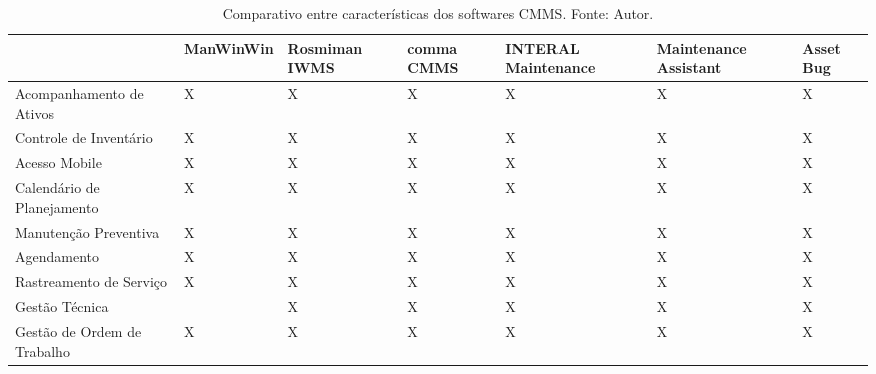 \begin{landscape}
\begin{table}[H]
\centering
\caption{Comparativo entre características dos softwares CMMS. Fonte: Autor.}
\label{comparativo}
\begin{tabular}{ | p{6cm} | p{3cm} | p{2cm} | p{2cm} | p{3cm} | p{3cm} | p{2cm} | }
\hline
	      & ManWinWin & Rosmiman IWMS & comma CMMS & INTERAL Maintenance & Maintenance Assistant & Asset Bug \\ \hline
	Acompanhamento de Ativos & X & X & X & X & X & X \\ \hline
	Controle de Inventário & X & X & X & X & X & X \\ \hline
	Acesso Mobile & X & X & X & X & X & X \\ \hline
	Calendário de Planejamento & X & X & X & X & X & X \\ \hline
	Manutenção Preventiva & X & X & X & X & X & X \\ \hline
	Agendamento & X & X & X & X & X & X \\ \hline
	Rastreamento de Serviço & X & X & X & X & X & X \\ \hline
	Gestão Técnica &  & X & X & X & X & X \\ \hline
	Gestão de Ordem de Trabalho & X & X & X & X & X & X \\ \hline
\end{tabular}
\end{table}
\end{landscape}


